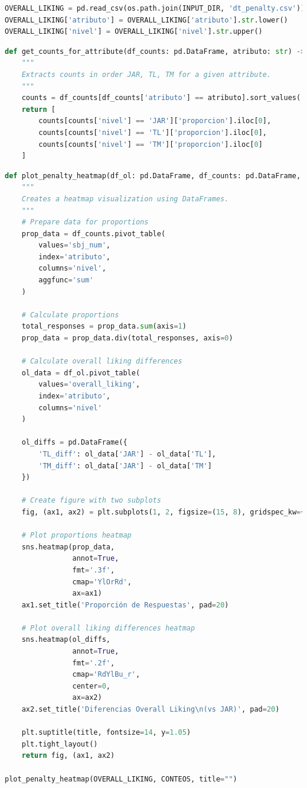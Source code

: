 \begin{lstlisting}[language=Python]
OVERALL_LIKING = pd.read_csv(os.path.join(INPUT_DIR, 'dt_penalty.csv'))
OVERALL_LIKING['atributo'] = OVERALL_LIKING['atributo'].str.lower()
OVERALL_LIKING['nivel'] = OVERALL_LIKING['nivel'].str.upper()
\end{lstlisting}

\begin{lstlisting}[language=Python]
def get_counts_for_attribute(df_counts: pd.DataFrame, atributo: str) -> list:
    """
    Extracts counts in order JAR, TL, TM for a given attribute.
    """
    counts = df_counts[df_counts['atributo'] == atributo].sort_values('nivel')
    return [
        counts[counts['nivel'] == 'JAR']['proporcion'].iloc[0],
        counts[counts['nivel'] == 'TL']['proporcion'].iloc[0],
        counts[counts['nivel'] == 'TM']['proporcion'].iloc[0]
    ]
\end{lstlisting}

\begin{lstlisting}[language=Python]
def plot_penalty_heatmap(df_ol: pd.DataFrame, df_counts: pd.DataFrame, title: str = "Penalty Analysis Heatmap"):
    """
    Creates a heatmap visualization using DataFrames.
    """
    # Prepare data for proportions
    prop_data = df_counts.pivot_table(
        values='sbj_num', 
        index='atributo', 
        columns='nivel', 
        aggfunc='sum'
    )
    
    # Calculate proportions
    total_responses = prop_data.sum(axis=1)
    prop_data = prop_data.div(total_responses, axis=0)
    
    # Calculate overall liking differences
    ol_data = df_ol.pivot_table(
        values='overall_liking',
        index='atributo',
        columns='nivel'
    )
    
    ol_diffs = pd.DataFrame({
        'TL_diff': ol_data['JAR'] - ol_data['TL'],
        'TM_diff': ol_data['JAR'] - ol_data['TM']
    })
    
    # Create figure with two subplots
    fig, (ax1, ax2) = plt.subplots(1, 2, figsize=(15, 8), gridspec_kw={'width_ratios': [1.5, 1]})
    
    # Plot proportions heatmap
    sns.heatmap(prop_data, 
                annot=True, 
                fmt='.3f',
                cmap='YlOrRd',
                ax=ax1)
    ax1.set_title('Proporción de Respuestas', pad=20)
    
    # Plot overall liking differences heatmap
    sns.heatmap(ol_diffs,
                annot=True,
                fmt='.2f',
                cmap='RdYlBu_r',
                center=0,
                ax=ax2)
    ax2.set_title('Diferencias Overall Liking\n(vs JAR)', pad=20)
    
    plt.suptitle(title, fontsize=14, y=1.05)
    plt.tight_layout()
    return fig, (ax1, ax2)

plot_penalty_heatmap(OVERALL_LIKING, CONTEOS, title="")
\end{lstlisting}

